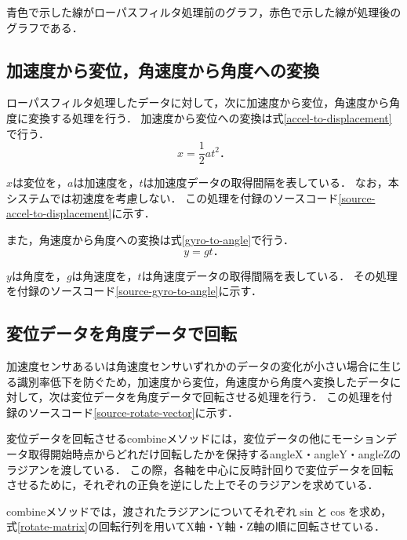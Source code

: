 青色で示した線がローパスフィルタ処理前のグラフ，赤色で示した線が処理後のグラフである．

\subsection{加速度から変位，角速度から角度への変換}
ローパスフィルタ処理したデータに対して，次に加速度から変位，角速度から角度に変換する処理を行う．
加速度から変位への変換は式\ref{accel-to-displacement}で行う．
\begin{equation}
\label{accel-to-displacement}
x = \frac{1}{2} a t^2．
\end{equation}

$x$は変位を，$a$は加速度を，$t$は加速度データの取得間隔を表している．
なお，本システムでは初速度を考慮しない．
この処理を付録のソースコード\ref{source-accel-to-displacement}に示す．

また，角速度から角度への変換は式\ref{gyro-to-angle}で行う．
\begin{equation}
\label{gyro-to-angle}
y = g t．
\end{equation}

$y$は角度を，$g$は角速度を，$t$は角速度データの取得間隔を表している．
その処理を付録のソースコード\ref{source-gyro-to-angle}に示す．

\subsection{変位データを角度データで回転}
加速度センサあるいは角速度センサいずれかのデータの変化が小さい場合に生じる識別率低下を防ぐため，加速度から変位，角速度から角度へ変換したデータに対して，次は変位データを角度データで回転させる処理を行う．
この処理を付録のソースコード\ref{source-rotate-vector}に示す．

変位データを回転させるcombineメソッドには，変位データの他にモーションデータ取得開始時点からどれだけ回転したかを保持するangleX・angleY・angleZのラジアンを渡している．
この際，各軸を中心に反時計回りで変位データを回転させるために，それぞれの正負を逆にした上でそのラジアンを求めている．

combineメソッドでは，渡されたラジアンについてそれぞれ$\sin$と$\cos$を求め，式\ref{rotate-matrix}の回転行列を用いてX軸・Y軸・Z軸の順に回転させている．

